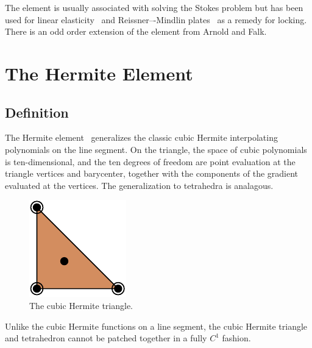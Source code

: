 
The element is usually associated with solving the Stokes problem but
has been used for linear elasticity~\cite{HansboLarson2003} and
Reissner–-Mindlin plates~\cite{ArnoldFalk1989} as a remedy for
locking. There is an odd order extension of the element from Arnold
and Falk.


\newpage

\section{The Hermite Element}

\subsection{Definition}

The Hermite element~\cite{Ciarlet2002} generalizes the classic cubic
Hermite interpolating polynomials on the line segment. On the
triangle, the space of cubic polynomials is ten-dimensional, and the
ten degrees of freedom are point evaluation at the triangle vertices
and barycenter, together with the components of the gradient evaluated
at the vertices. The generalization to tetrahedra is analagous.

\begin{figure}[h]
  \begin{center}
    \includegraphics[width=\smallfig]{chapters/kirby-6/pdf/HER3.pdf}
    \caption{The cubic Hermite triangle.}
  \end{center}
\end{figure}

Unlike the cubic Hermite functions on a line segment, the cubic
Hermite triangle and tetrahedron cannot be patched together in a fully
\( C^1 \) fashion.

